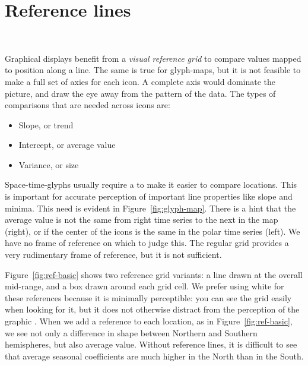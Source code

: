 \documentclass[oneside]{article}
\begin{document}
\section{Reference lines}~\label{sec:reference}

Graphical displays benefit from a \emph{visual reference grid} \citep{cleveland:1993a} to compare values mapped to position along a line. The same is true for glyph-maps, but it is not feasible to make a full set of axies for each icon. A complete axis would dominate the picture, and draw the eye away from the pattern of the data. The types of comparisons that are needed across icons are:

\begin{itemize} \itemsep 0in
\item Slope, or trend
\item Intercept, or average value
\item Variance, or size
\end{itemize}

Space-time-glyphs usually require a  to make it easier to compare locations. This is important for accurate perception of important line properties like slope and minima. This need is evident in Figure~\ref{fig:glyph-map}. There is a hint that the average value is not the same from right time series to the next in the map (right), or if the center of the icons is the same in the polar time series (left). We have no frame of reference on which to judge this. The regular grid provides a very rudimentary frame of reference, but it is not sufficient. 

Figure~\ref{fig:ref-basic} shows two reference grid variants: a line drawn at the overall mid-range, and a box drawn around each grid cell. We prefer using white for these references because it is minimally perceptible: you can see the grid easily when looking for it, but it does not otherwise distract from the perception of the graphic \citep{carr:1994}. When we add a reference to each location, as in Figure~\ref{fig:ref-basic}, we see not only a difference in shape between Northern and Southern hemispheres, but also average value. Without reference lines, it is difficult to see that average seasonal coefficients are much higher in the North than in the South.

\end{document}
